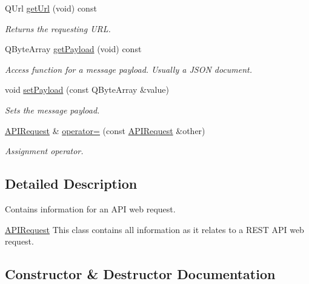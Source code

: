 \begin{DoxyCompactItemize}
Q\+Url \hyperlink{class_a_p_i_request_ab4f5dc1d54250fc927872cfcc59cc3cc}{get\+Url} (void) const
\begin{DoxyCompactList}\small\item\em Returns the requesting U\+RL. \end{DoxyCompactList}\item 
\mbox{\label{class_a_p_i_request_af70046cd59021cc3877f380ca46ac6e7}} 
Q\+Byte\+Array \hyperlink{class_a_p_i_request_af70046cd59021cc3877f380ca46ac6e7}{get\+Payload} (void) const
\begin{DoxyCompactList}\small\item\em Access function for a message payload. Usually a J\+S\+ON document. \end{DoxyCompactList}\item 
\mbox{\label{class_a_p_i_request_a2d16b4ff383297fff242db0b71139c2b}} 
void \hyperlink{class_a_p_i_request_a2d16b4ff383297fff242db0b71139c2b}{set\+Payload} (const Q\+Byte\+Array \&value)
\begin{DoxyCompactList}\small\item\em Sets the message payload. \end{DoxyCompactList}\item 
\mbox{\label{class_a_p_i_request_a5e07ea518a0bb0a750ec8f2d58e9acc5}} 
\hyperlink{class_a_p_i_request}{A\+P\+I\+Request} \& \hyperlink{class_a_p_i_request_a5e07ea518a0bb0a750ec8f2d58e9acc5}{operator=} (const \hyperlink{class_a_p_i_request}{A\+P\+I\+Request} \&other)
\begin{DoxyCompactList}\small\item\em Assignment operator. \end{DoxyCompactList}\end{DoxyCompactItemize}


\subsection{Detailed Description}
Contains information for an A\+PI web request. 

\hyperlink{class_a_p_i_request}{A\+P\+I\+Request} This class contains all information as it relates to a R\+E\+ST A\+PI web request. 

\subsection{Constructor \& Destructor Documentation}
\mbox{\label{class_a_p_i_request_a5c6b7f4e52cf0d36bd3bb2280ab59331}} 

